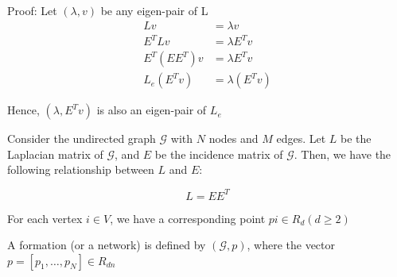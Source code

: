 \documentclass{article}
\begin{document}
    Proof: Let $(\lambda ,v)$ be any eigen-pair of L
    \begin{equation}
        \begin{array}{rl}
             Lv & = \lambda v \\
             E^TLv & = \lambda E^Tv \\
             E^T(EE^T)v & = \lambda E^Tv \\
             L_e(E^Tv) & = \lambda (E^Tv)
        \end{array}
    \end{equation}

    Hence, $(\lambda, E^Tv)$ is also an eigen-pair of $L_e$

    Consider the undirected graph $\mathcal{G}$ with $N$ nodes and $M$ edges. Let $L$ be the Laplacian matrix of $\mathcal{G}$, and $E$ be the incidence matrix of $\mathcal{G}$. Then, we have the following relationship between $L$ and $E$:

    \begin{equation}
        L = E E^T
    \end{equation}

    For each vertex $i \in V$, we have a corresponding point $pi \in R_d (d \geq 2)$

    A formation (or a network) is defined by $(\mathcal{G},p)$, where the vector $p = [p_1,\dots,p_N] \in R_{dn}$ 
 
\end{document}
